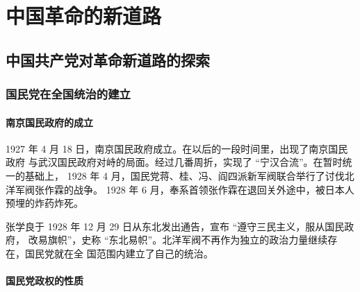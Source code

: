 \documentclass[10pt, UTF8]{book} %
\begin{document}
\chapter{中国革命的新道路}
\thispagestyle{empty}




\section{中国共产党对革命新道路的探索}

\subsection{国民党在全国统治的建立}

\subsubsection{南京国民政府的成立}

1927 年 4 月 18 日，南京国民政府成立。在以后的一段时间里，出现了南京国民政府
与武汉国民政府对峙的局面。经过几番周折，实现了 “宁汉合流”。在暂时统一的基础上，
1928 年 4 月，国民党蒋、桂、冯、阎四派新军阀联合举行了讨伐北洋军阀张作霖的战争。
1928 年 6 月，奉系首领张作霖在退回关外途中，被日本人预埋的炸药炸死。

张学良于 1928 年 12 月 29 日从东北发出通告，宣布 “遵守三民主义，服从国民政府，
改易旗帜”，史称 “东北易帜”。北洋军阀不再作为独立的政治力量继续存在，国民党就在全
国范围内建立了自己的统治。

\subsubsection{国民党政权的性质}
\end{document}
